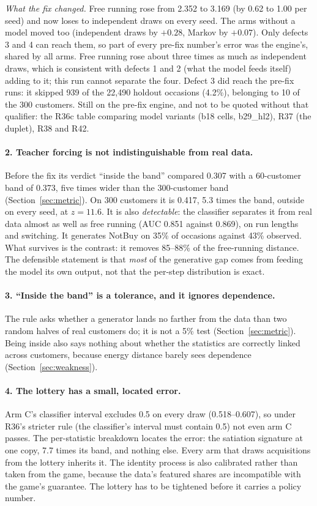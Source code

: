\documentclass[11pt]{article}
\begin{document}
\noindent \emph{What the fix changed.} Free running rose from 2.352 to 3.169
(by 0.62 to 1.00 per seed) and now loses to independent draws on every seed.
The arms without a model moved too (independent draws by $+0.28$, Markov by
$+0.07$). Only defects 3 and 4 can reach them, so part of every pre-fix
number's error was the engine's, shared by all arms. Free running rose about
three times as much as independent draws, which is consistent with defects 1
and 2 (what the model feeds itself) adding to it; this run cannot separate the
four. Defect 3 did reach the pre-fix runs: it skipped 939 of the 22,490 holdout
occasions (4.2\%), belonging to 10 of the 300 customers. Still on the pre-fix
engine, and not to be quoted without that qualifier: the R36c table comparing
model variants (b18 cells, b29\_hl2), R37 (the duplet), R38 and R42.

\paragraph{2. Teacher forcing is not indistinguishable from real data.} Before
the fix its verdict ``inside the band'' compared 0.307 with a 60-customer band
of 0.373, five times wider than the 300-customer band
(Section~\ref{sec:metric}). On 300 customers it is 0.417, 5.3 times the band,
outside on every seed, at $z = 11.6$. It is also \emph{detectable}: the
classifier separates it from real data almost as well as free running (AUC
0.851 against 0.869), on run lengths and switching. It generates NotBuy on
35\% of occasions against 43\% observed. What survives is the contrast: it
removes 85--88\% of the free-running distance. The defensible statement is
that \emph{most} of the generative gap comes from feeding the model its own
output, not that the per-step distribution is exact.

\paragraph{3. ``Inside the band'' is a tolerance, and it ignores dependence.}
The rule asks whether a generator lands no farther from the data than two random
halves of real customers do; it is not a 5\% test (Section~\ref{sec:metric}).
Being inside also says nothing about whether the statistics are correctly linked
across customers, because energy distance barely sees dependence
(Section~\ref{sec:weakness}).

\paragraph{4. The lottery has a small, located error.} Arm C's classifier
interval excludes 0.5 on every draw (0.518--0.607), so under R36's stricter rule
(the classifier's interval must contain 0.5) not even arm C passes. The
per-statistic breakdown locates the error: the satiation signature at one copy,
7.7 times its band, and nothing else. Every arm that draws acquisitions from the
lottery inherits it. The identity process is also calibrated rather than taken
from the game, because the data's featured shares are incompatible with the
game's guarantee. The lottery has to be tightened before it carries a policy
number.
\end{document}
